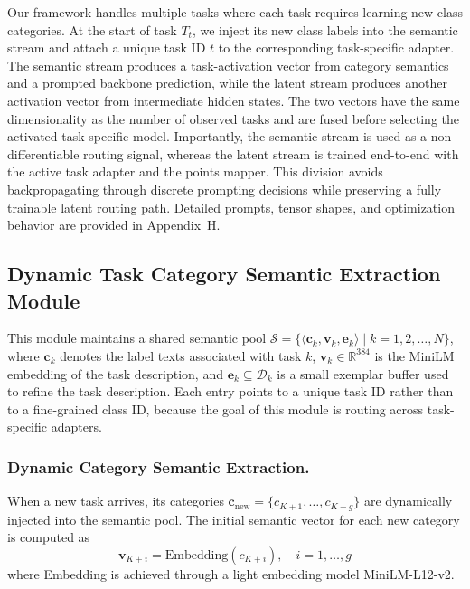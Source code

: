 \documentclass[11pt]{article}
\begin{document}
Our framework handles multiple tasks where each task requires learning new class categories. At the start of task $T_t$, we inject its new class labels into the semantic stream and attach a unique task ID $t$ to the corresponding task-specific adapter. The semantic stream produces a task-activation vector from category semantics and a prompted backbone prediction, while the latent stream produces another activation vector from intermediate hidden states. The two vectors have the same dimensionality as the number of observed tasks and are fused before selecting the activated task-specific model. Importantly, the semantic stream is used as a non-differentiable routing signal, whereas the latent stream is trained end-to-end with the active task adapter and the points mapper. This division avoids backpropagating through discrete prompting decisions while preserving a fully trainable latent routing path. Detailed prompts, tensor shapes, and optimization behavior are provided in Appendix~H.

\subsection{Dynamic Task Category Semantic Extraction Module}

This module maintains a shared semantic pool $\mathcal{S} = \{ \langle \mathbf{c}_k, \mathbf{v}_k, \mathbf{e}_k \rangle \mid k = 1, 2, \dots, N \}$, where $\mathbf{c}_k$ denotes the label texts associated with task $k$, $\mathbf{v}_k \in \mathbb{R}^{384}$ is the MiniLM embedding of the task description, and $\mathbf{e}_k \subseteq \mathcal{D}_k$ is a small exemplar buffer used to refine the task description. Each entry points to a unique task ID rather than to a fine-grained class ID, because the goal of this module is routing across task-specific adapters.

\subsubsection{Dynamic Category Semantic Extraction.}

When a new task arrives, its categories $\mathbf{c}_{\text{new}} = \{ c_{K+1}, \dots, c_{K+g} \}$ are dynamically injected into the semantic pool. The initial semantic vector for each new category is computed as
\begin{equation}
    \mathbf{v}_{K+i} = \text{Embedding}(c_{K+i}), \quad i = 1, \dots, g
\end{equation}
where Embedding is achieved through a light embedding model MiniLM-L12-v2.
\end{document}
